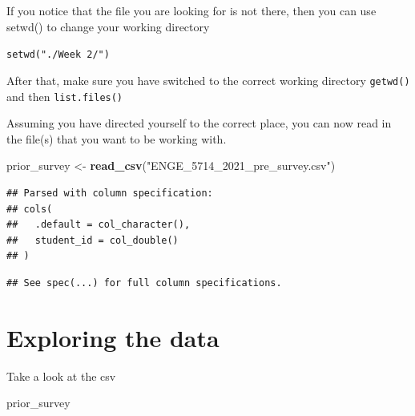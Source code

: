 \documentclass[
]{book}
\newenvironment{Shaded}{\begin{snugshade}}{\end{snugshade}}
\newcommand{\KeywordTok}[1]{\textcolor[rgb]{0.13,0.29,0.53}{\textbf{#1}}}
\newcommand{\NormalTok}[1]{#1}
\newcommand{\StringTok}[1]{\textcolor[rgb]{0.31,0.60,0.02}{#1}}
\begin{document}
If you notice that the file you are looking for is not there, then you can use setwd() to change your working directory

\texttt{setwd("./Week\ 2/")}

After that, make sure you have switched to the correct working directory
\texttt{getwd()} and then \texttt{list.files()}

Assuming you have directed yourself to the correct place, you can now read in the file(s) that you want to be working with.

\begin{Shaded}
\begin{Highlighting}[]
\NormalTok{prior\_survey \textless{}{-}}\StringTok{ }\KeywordTok{read\_csv}\NormalTok{(}\StringTok{"ENGE\_5714\_2021\_pre\_survey.csv"}\NormalTok{)}
\end{Highlighting}
\end{Shaded}

\begin{verbatim}
## Parsed with column specification:
## cols(
##   .default = col_character(),
##   student_id = col_double()
## )
\end{verbatim}

\begin{verbatim}
## See spec(...) for full column specifications.
\end{verbatim}

\hypertarget{exploring-the-data}{%
\section{Exploring the data}\label{exploring-the-data}}

Take a look at the csv

\begin{Shaded}
\begin{Highlighting}[]
\NormalTok{prior\_survey}
\end{Highlighting}
\end{Shaded}
\end{document}
